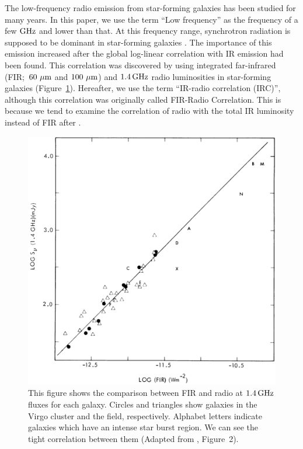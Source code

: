 The low-frequency radio emission from star-forming galaxies has been studied for many years.
In this paper, we use the term ``Low frequency'' as the frequency of a few $\mathrm{GHz}$ and lower than that.
At this frequency range, synchrotron radiation is supposed to be dominant in star-forming galaxies \citep{Condon1992a}.
The importance of this emission increased after the global log-linear correlation with IR emission had been found.
This correlation was discovered by \citet{Helou1985} using integrated far-infrared (FIR;~$60\,\,\mathrm{\mu m}$ and $100\,\,\mathrm{\mu m}$) and $1.4\,\mathrm{GHz}$ radio luminosities in star-forming galaxies (Figure~\ref{fig:Helou1985_figure2}).
Hereafter, we use the term ``IR-radio correlation (IRC)'', although this correlation was originally called FIR-Radio Correlation.
This is because we tend to examine the correlation of radio with the total IR luminosity instead of FIR after \citet{Bell2003}.

\begin{figure}[htbp]
	\centering
	\includegraphics[width=.6\linewidth]{Chapter_1/Figures/Helou1985_Figure2.png}
    \caption[FIR and radio correlation]{\label{fig:Helou1985_figure2}
        This figure shows the comparison between FIR and radio at $1.4\,\mathrm{GHz}$ fluxes for each galaxy.
        Circles and triangles show galaxies in the Virgo cluster and the field, respectively.
        Alphabet letters indicate galaxies which have an intense star burst region.
        We can see the tight correlation between them
        (Adapted from \citealt{Helou1985}, Figure~2).
    }
\end{figure}

